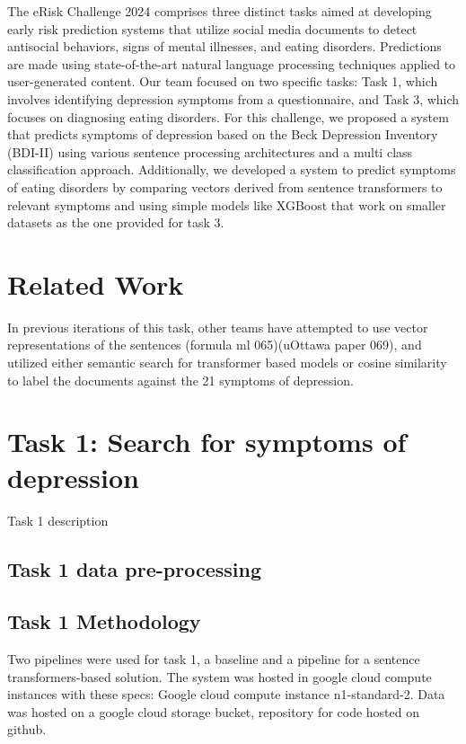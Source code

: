 \documentclass[]{style/ceurart}
\begin{document}
The eRisk Challenge 2024 comprises three distinct tasks aimed at developing early risk prediction systems that utilize social media documents to detect antisocial behaviors, signs of mental illnesses, and eating disorders. Predictions are made using state-of-the-art natural language processing techniques applied to user-generated content. Our team focused on two specific tasks: Task 1, which involves identifying depression symptoms from a questionnaire, and Task 3, which focuses on diagnosing eating disorders. For this challenge, we proposed a system that predicts symptoms of depression based on the Beck Depression Inventory (BDI-II) using various sentence processing architectures and a multi class classification approach. Additionally, we developed a system to predict symptoms of eating disorders by comparing vectors derived from sentence transformers to relevant symptoms and using simple models like XGBoost that work on smaller datasets as the one provided for task 3.


\section{Related Work}

In previous iterations of this task, other teams have attempted to use vector representations of the sentences (formula ml 065)(uOttawa paper 069), and utilized either semantic search for transformer based models or cosine similarity to label the documents against the 21 symptoms of depression.

\section{Task 1: Search for symptoms of depression}

Task 1 description

\subsection{Task 1 data pre-processing}


\subsection{Task 1 Methodology}

Two pipelines were used for task 1, a baseline and a pipeline for a sentence transformers-based solution. The system was hosted in google cloud compute instances with these specs: Google cloud compute instance n1-standard-2. Data was hosted on a google cloud storage bucket, repository for code hosted on github.
\end{document}
